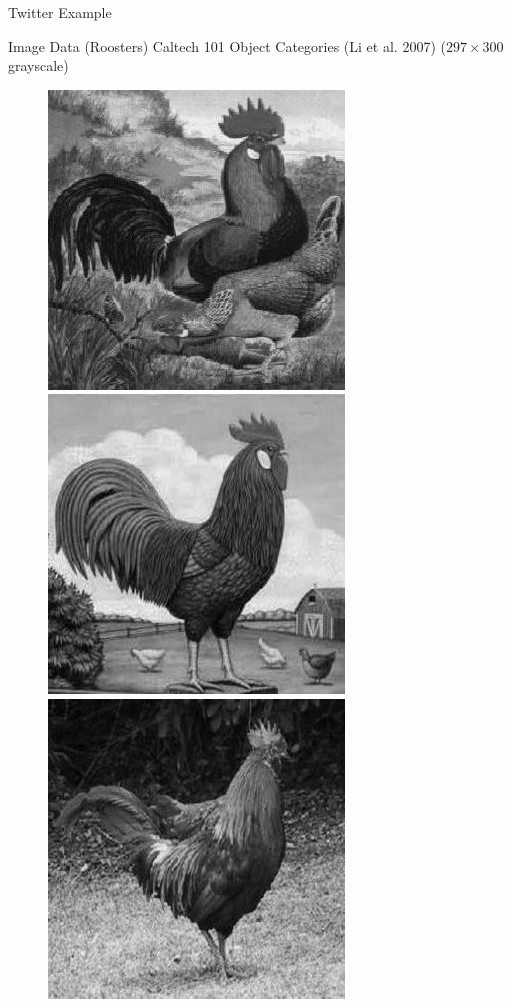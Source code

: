 \documentclass{beamer}
\begin{document}
\begin{frame}{Twitter Example}
  \begin{center}
    \resizebox{10.0cm}{!}{
      
    }
  \end{center}
\end{frame}

\begin{frame}{Image Data (Roosters)}
  Caltech 101 Object Categories (Li et al. 2007) ($297 \times
  300$ grayscale)
  \begin{figure}
    \centering
    \includegraphics[scale=.35]{roosterrs-image_0001.jpg}
    \includegraphics[scale=.35]{roosterrs-image_0002.jpg} \\
    \includegraphics[scale=.35]{roosterrs-image_0003.jpg}

\end{figure}
\end{frame}
\end{document}
